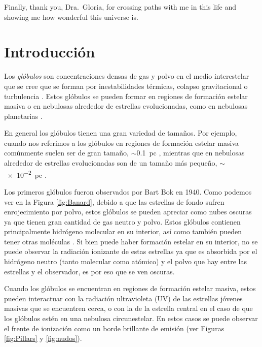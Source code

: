 \documentclass{book}
\begin{document}
Finally, thank you, Dra.~Gloria, for crossing paths with me in this
life and showing me how wonderful this universe is.

\newpage

\tableofcontents

\newpage

\chapter{Introducción}\label{Capitulo 1:introduccion}

Los \textit{glóbulos} son concentraciones densas de gas y polvo en el
medio interestelar que se cree que se forman por inestabilidades
térmicas, colapso gravitacional o turbulencia
\citep{Ballesteros:2011,Padoan:2002}. Estos glóbulos se pueden formar
en regiones de formación estelar masiva o en nebulosas alrededor de
estrellas evolucionadas, como en nebulosas planetarias
\citep{O'Dell:2007}.

En general los glóbulos tienen una gran variedad de tamaños. Por
ejemplo, cuando nos referimos a los glóbulos en regiones de formación
estelar masiva comúnmente suelen ser de gran tamaño,
$\sim$\SI{0.1}{pc} \citep{Schenider:2016}, mientras que en nebulosas
alrededor de estrellas evolucionadas son de un tamaño más pequeño,
$\sim$\SI{e-2}{pc} \citep{GFGahm:2013}.

Los primeros glóbulos fueron observados por Bart Bok en 1940. Como
podemos ver en la Figura \ref{fig:Banard}, debido a que las estrellas
de fondo sufren enrojecimiento por polvo, estos glóbulos se pueden
apreciar como nubes oscuras ya que tienen gran cantidad de gas neutro
y polvo. Estos glóbulos contienen principalmente hidrógeno molecular
en su interior, así como también pueden tener otras moléculas
\citep{Amin:2005, DFrancesco:2002}. Si bien puede haber formación
estelar en su interior, no se puede observar la radiación ionizante de
estas estrellas ya que es absorbida por el hidrógeno neutro (tanto
molecular como atómico) y el polvo que hay entre las estrellas y el
observador, es por eso que se ven oscuras.

Cuando los glóbulos se encuentran en regiones de formación estelar
masiva, estos pueden interactuar con la radiación ultravioleta (UV) de
las estrellas jóvenes masivas que se encuentren cerca, o con la de la
estrella central en el caso de que los glóbulos estén en una nebulosa
circunestelar. En estos casos se puede observar el frente de
ionización como un borde brillante de emisión (ver Figuras
\ref{fig:Pillars} y \ref{fig:nudos}).
\end{document}
